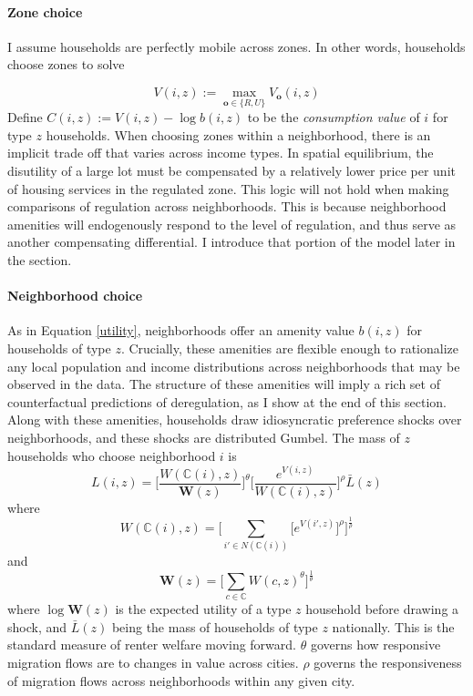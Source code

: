 \documentclass[12pt]{article}
\begin{document}
	\paragraph*{Zone choice}
	I assume households are perfectly mobile across zones. In other words, households choose zones to solve 
	
	\begin{equation}\label{zonechoice}
		V(i, z) := \max_{\boldsymbol{o} \in \{R, U\}}V_{\boldsymbol{o}}(i, z)
	\end{equation}
	Define $C(i, z) := V(i, z) - \log b(i, z)$ to be the \textit{consumption value} of $i$ for type $z$ households. When choosing zones within a neighborhood, there is an implicit trade off that varies across income types. In spatial equilibrium, the disutility of a large lot must be compensated by a relatively lower price per unit of housing services in the regulated zone. 
	This logic will not hold when making comparisons of regulation across neighborhoods. This is because neighborhood amenities will endogenously respond to the level of regulation, and thus serve as another compensating differential. I introduce that portion of the model later in the section. 

	\paragraph*{Neighborhood choice} 
	As in Equation \eqref{utility}, neighborhoods offer an amenity value $b(i, z)$ for households of type $z$. Crucially, these amenities are flexible enough to rationalize any local population and income distributions across neighborhoods that may be observed in the data. The structure of these amenities will imply a rich set of counterfactual predictions of deregulation, as I show at the end of this section. Along with these amenities, households draw idiosyncratic preference shocks over neighborhoods, and these shocks are distributed Gumbel. The mass of $z$ households who choose neighborhood $i$ is 
	\begin{equation}\label{laboursupply}
	L(i, z) = \bigg[\frac{W(\mathbb{C}(i), z)}{\boldsymbol{W}(z)}\bigg]^{\theta}\bigg[\frac{e^{V(i, z)}}{W(\mathbb{C}(i), z)}\bigg]^{\rho}\bar{L}(z)
	\end{equation}
	where
	\begin{equation*}
	W(\mathbb{C}(i), z) = \bigg[\sum_{i' \in N(\mathbb{C}(i))}\big[e^{V(i', z)}\big]^{\rho}\bigg]^{\frac{1}{\rho}}
	\end{equation*} 
	and 
	\begin{equation}\label{Welfare}
		\boldsymbol{W}(z) = \bigg[\sum_{c \in \mathbb{C}} W(c, z)^{\theta}\bigg]^{\frac{1}{\theta}}	
	\end{equation}
	where $\log \boldsymbol{W}(z)$ is the expected utility of a type $z$ household before drawing a shock, and $\bar{L}(z)$ being the mass of households of type $z$ nationally.  This is the standard measure of renter welfare moving forward. $\theta$ governs how responsive migration flows are to changes in value across cities. $\rho$ governs the responsiveness of migration flows across neighborhoods within any given city. 
 
\end{document}
